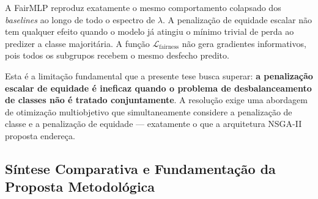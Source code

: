 \begin{table}[H]
    \centering
    \caption{SINASC: Efeito da penalização de viés na FairMLP (lambda sweep).}
    \vspace{2mm}
    \label{tab:sinasc_lambda_sweep}
\end{table}

A FairMLP reproduz exatamente o mesmo comportamento colapsado dos \textit{baselines} ao longo de todo o espectro de $\lambda$. A penalização de equidade escalar não tem qualquer efeito quando o modelo já atingiu o mínimo trivial de perda ao predizer a classe majoritária. A função $\mathcal{L}_{\text{fairness}}$ não gera gradientes informativos, pois todos os subgrupos recebem o mesmo desfecho predito.

Esta é a limitação fundamental que a presente tese busca superar: \textbf{a penalização escalar de equidade é ineficaz quando o problema de desbalanceamento de classes não é tratado conjuntamente}. A resolução exige uma abordagem de otimização multiobjetivo que simultaneamente considere a penalização de classe e a penalização de equidade --- exatamente o que a arquitetura NSGA-II proposta endereça.

\subsection{Síntese Comparativa e Fundamentação da Proposta Metodológica}
\label{subsec:sintese_comparativa}

